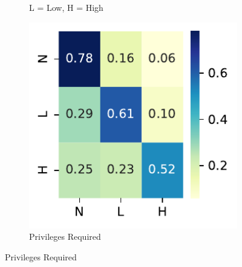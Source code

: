 \documentclass[12pt]{article}
\begin{document}
\begin{figure}
\begin{subfigure}[b]{0.45\textwidth}
		\begin{tablenotes}
			\footnotesize
			\item \quad L = Low, H = High
		\end{tablenotes}
	\end{subfigure}

	\vspace{1em}

	\begin{subfigure}[b]{0.45\textwidth}
		\includegraphics[width=\textwidth]{./figures/confusion_matrices/privileges_required_nvd.pdf}
		\caption{Privileges Required}


\end{subfigure}
\end{figure}
\end{document}
